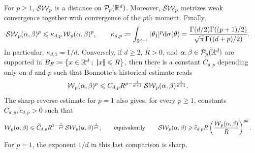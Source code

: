 \begin{prop}\label{prop-sliced-wasserstein-metric}
	For $p\geq1$, $\operatorname{\mathcal{SW}}_p$ is a distance on $\mathcal{P}_p(\mathbb{R}^d)$. Moreover, $\operatorname{\mathcal{SW}}_p$ metrizes weak convergence together with convergence of the $p$th moment. Finally,
	\[
		\operatorname{\mathcal{SW}}_p(\alpha,\beta)^p
		\leqslant
		\kappa_{d,p}\operatorname{\mathcal{W}}_p(\alpha,\beta)^p,
		\qquad
		\kappa_{d,p}
		\coloneqq
		\int_{\mathbb{S}^{d-1}}|\theta_1|^p\mathrm{d}\sigma(\theta)
		=
		\frac{\Gamma(d/2)\Gamma((p+1)/2)}{\sqrt{\pi}\,\Gamma((d+p)/2)}.
	\]
	In particular, $\kappa_{d,2}=1/d$. Conversely, if $d\geq2$, $R>0$, and $\alpha,\beta\in\mathcal{P}_p(\mathbb{R}^d)$ are supported in
	\(B_R\coloneqq\left\{ x\in\mathbb{R}^d \;;\; |\!| x |\!|\leqslant R \right\}\), then there is a constant
	$C_{d,p}$ depending only on $d$ and $p$ such that Bonnotte's historical estimate reads
	\[
		\operatorname{\mathcal{W}}_p(\alpha,\beta)^p
		\leqslant
		C_{d,p}R^{p-\frac{1}{d+1}}
		\operatorname{\mathcal{SW}}_p(\alpha,\beta)^{\frac{1}{d+1}}.
	\]
	The sharp reverse estimate for $p=1$ also gives, for every $p\geq1$, constants $\widetilde C_{d,p},\widetilde c_{d,p}>0$ such that
	\[
		\operatorname{\mathcal{W}}_p(\alpha,\beta)
		\leqslant
		\widetilde C_{d,p}
		R^{1-\frac{1}{pd}}
		\operatorname{\mathcal{SW}}_p(\alpha,\beta)^{\frac{1}{pd}},
		\qquad\text{equivalently}\qquad
		\operatorname{\mathcal{SW}}_p(\alpha,\beta)
		\geqslant
		\widetilde c_{d,p}R
		\left(\frac{\operatorname{\mathcal{W}}_p(\alpha,\beta)}{R}\right)^{pd}.
	\]
	For $p=1$, the exponent $1/d$ in this last comparison is sharp.
\end{prop}

